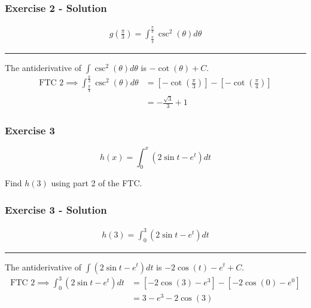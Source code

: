 \documentclass[12pt]{beamer}
\begin{document}
\begin{frame}
	\frametitle{Exercise 2 - Solution}

	\Large
	\begin{align*}
		g\left(\frac{\pi}{3}\right)=\int_{\frac{\pi}{4}}^{\frac{\pi}{3}}\csc^2\left(\theta\right)d\theta
	\end{align*}
	\small
	\hrule
	\vfill
	\vfill
	The antiderivative of $\int \csc^2\left(\theta\right)d\theta$ is $-\cot\left(\theta\right)+C$.
	\small
	\begin{align*}
		\text{FTC 2}\implies \int_{\frac{\pi}{4}}^{\frac{\pi}{3}}\csc^2\left(\theta\right)d\theta &= \left[-\cot\left(\frac{\pi}{3}\right)\right]-\left[-\cot\left(\frac{\pi}{4}\right)\right] \\
		&= \boxed{-\frac{\sqrt{3}}{3}+1}
	\end{align*}
	\vfill
	\vfill
	\vfill
\end{frame}
\begin{frame}
	\frametitle{Exercise 3}

	\vfill
	\vfill
	\Large
	\[h(x)=\int_{0}^{x}\left(2\sin{t}-e^t\right)dt\]
	\vfill
	\begin{center}
		Find $h(3)$ using part 2 of the FTC.
	\end{center}
	\vfill
	\vfill
\end{frame}
\begin{frame}
	\frametitle{Exercise 3 - Solution}

	\Large
	\begin{align*}
		h(3)=\int_{0}^{3}\left(2\sin{t}-e^t\right)dt
	\end{align*}
	\small
	\hrule
	\vfill
	\vfill
	The antiderivative of $\int \left(2\sin{t}-e^t\right)dt$ is $-2\cos(t)-e^t+C$.
	\small
	\begin{align*}
		\text{FTC 2}\implies \int_{0}^{3}\left(2\sin{t}-e^t\right)dt &= [-2\cos(3)-e^3]-[-2\cos(0)-e^0] \\
		&= \boxed{3-e^3-2\cos(3)}
	\end{align*}
	\vfill
	\vfill
	\vfill
\end{frame}
\end{document}
